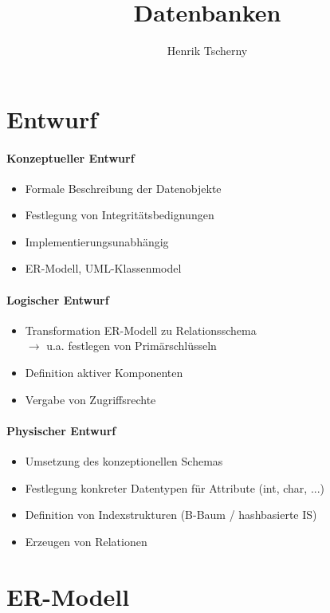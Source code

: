 \documentclass[12pt,a4paper]{article}
\title{Datenbanken}
\author{Henrik Tscherny}
\begin{document}
\maketitle
\tableofcontents

\section{Entwurf}
\paragraph{Konzeptueller Entwurf}
\begin{itemize}
\item Formale Beschreibung der Datenobjekte
\item Festlegung von Integritätsbedignungen
\item Implementierungsunabhängig
\item ER-Modell, UML-Klassenmodel
\end{itemize}
\paragraph{Logischer Entwurf}
\begin{itemize}
\item Transformation ER-Modell zu Relationsschema\\
$\rightarrow$ u.a. festlegen von Primärschlüsseln
\item Definition aktiver Komponenten
\item Vergabe von Zugriffsrechte
\end{itemize}
\paragraph{Physischer Entwurf}
\begin{itemize}
\item Umsetzung des konzeptionellen Schemas
\item Festlegung konkreter Datentypen für Attribute (int, char, ...)
\item Definition von Indexstrukturen (B-Baum / hashbasierte IS)
\item Erzeugen von Relationen
\end{itemize}
\section{ER-Modell}
\end{document}
